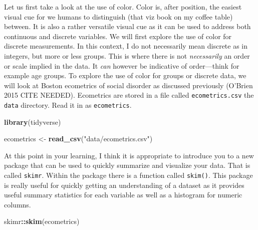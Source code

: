 \documentclass[
]{book}
\newenvironment{Shaded}{\begin{snugshade}}{\end{snugshade}}
\newcommand{\KeywordTok}[1]{\textcolor[rgb]{0.13,0.29,0.53}{\textbf{#1}}}
\newcommand{\NormalTok}[1]{#1}
\newcommand{\OperatorTok}[1]{\textcolor[rgb]{0.81,0.36,0.00}{\textbf{#1}}}
\newcommand{\StringTok}[1]{\textcolor[rgb]{0.31,0.60,0.02}{#1}}
\begin{document}
Let us first take a look at the use of color. Color is, after position, the easiest visual cue for we humans to distinguish (that viz book on my coffee table) between. It is also a rather versatile visual cue as it can be used to address both continuous and discrete variables. We will first explore the use of color for discrete measurements. In this context, I do not necessarily mean discrete as in integers, but more or less groups. This is where there is not \emph{necessarily} an order or scale implied in the data. It \emph{can} however be indicative of order---think for example age groups. To explore the use of color for groups or discrete data, we will look at Boston ecometrics of social disorder as discussed previously (O'Brien 2015 CITE NEEDED). Ecometrics are stored in a file called \texttt{ecometrics.csv} the \texttt{data} directory. Read it in as \texttt{ecometrics}.

\begin{Shaded}
\begin{Highlighting}[]
\KeywordTok{library}\NormalTok{(tidyverse)}

\NormalTok{ecometrics \textless{}{-}}\StringTok{ }\KeywordTok{read\_csv}\NormalTok{(}\StringTok{"data/ecometrics.csv"}\NormalTok{)}
\end{Highlighting}
\end{Shaded}

At this point in your learning, I think it is appropriate to introduce you to a new package that can be used to quickly summarize and visualize your data. That is called \texttt{skimr}. Within the package there is a function called \texttt{skim()}. This package is really useful for quickly getting an understanding of a dataset as it provides useful summary statistics for each variable as well as a histogram for numeric columns.

\begin{Shaded}
\begin{Highlighting}[]
\NormalTok{skimr}\OperatorTok{::}\KeywordTok{skim}\NormalTok{(ecometrics)}
\end{Highlighting}
\end{Shaded}
\end{document}

